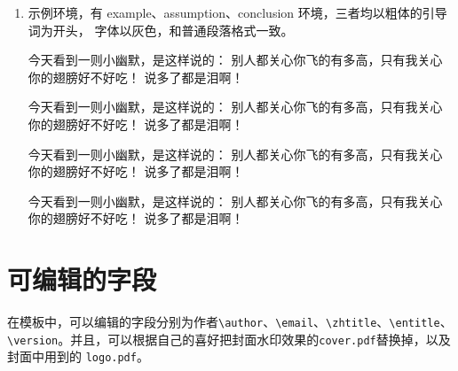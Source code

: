 \documentclass[cyan]{elegantnote}
\begin{document}
\begin{enumerate}
\item 示例环境，有{\color{main} example、assumption、conclusion} 环境，三者均以粗体的引导词为开头，
字体以灰色，和普通段落格式一致。
\begin{example}
	今天看到一则小幽默，是这样说的：{\color{main} 别人都关心你飞的有多高，只有我关心你的翅膀好不好吃！}
说多了都是泪啊！
\end{example}
\begin{assumption}
	今天看到一则小幽默，是这样说的：{\color{main} 别人都关心你飞的有多高，只有我关心你的翅膀好不好吃！}
说多了都是泪啊！
\end{assumption}
\begin{conclusion}
今天看到一则小幽默，是这样说的：{\color{main} 别人都关心你飞的有多高，只有我关心你的翅膀好不好吃！}
说多了都是泪啊！
\end{conclusion}
\begin{conclusion}
今天看到一则小幽默，是这样说的：{\color{main} 别人都关心你飞的有多高，只有我关心你的翅膀好不好吃！}
说多了都是泪啊！
\end{conclusion}

\end{enumerate}

\section{可编辑的字段}
在模板中，可以编辑的字段分别为作者\verb|\author|、\verb|\email|、\verb|\zhtitle|、\verb|\entitle|、
\verb|\version|。并且，可以根据自己的喜好把封面水印效果的\verb|cover.pdf|替换掉，以及封面中用到的
\verb|logo.pdf|。
\end{document}
